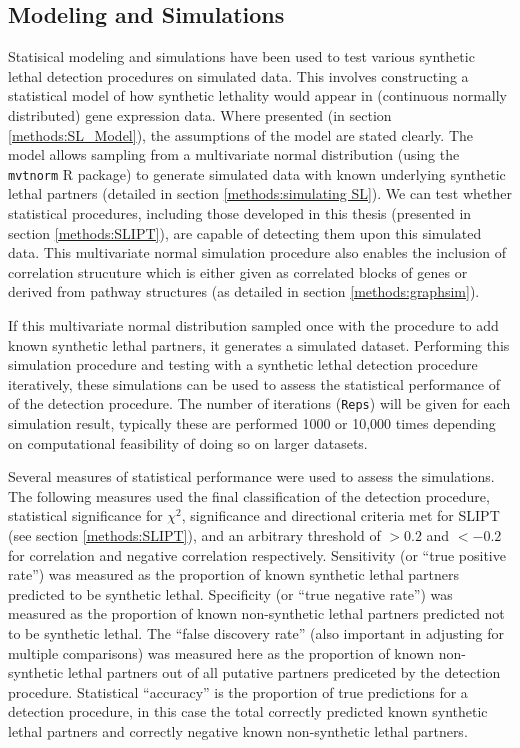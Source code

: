 \subsection{Modeling and Simulations}
Statisical modeling and simulations have been used to test various synthetic lethal detection procedures on simulated data. This involves constructing a statistical model of how synthetic lethality would appear in (continuous normally distributed) gene expression data. Where presented (in section \ref{methods:SL_Model}), the assumptions of the model are stated clearly. The model allows sampling from a multivariate normal distribution (using the \texttt{mvtnorm} R package) to generate simulated data with known underlying synthetic lethal partners (detailed in section \ref{methods:simulating SL}). We can test whether statistical procedures, including those developed in this thesis (presented in section \ref{methods:SLIPT}), are capable of detecting them upon this simulated data. This multivariate normal simulation procedure also enables the inclusion of correlation strucuture which is either given as correlated blocks of genes or derived from pathway structures (as detailed in section \ref{methods:graphsim}).

If this multivariate normal distribution sampled once with the procedure to add known synthetic lethal partners, it generates a simulated dataset. Performing this simulation procedure and testing with a synthetic lethal detection procedure iteratively, these simulations can be used to assess the statistical performance of of the detection procedure. The number of iterations (\texttt{Reps}) will be given for each simulation result, typically these are performed 1000 or 10,000 times depending on computational feasibility of doing so on larger datasets. 

Several measures of statistical performance were used to assess the simulations. The following measures used the final classification of the detection procedure, statistical significance for $\chi^2$, significance and directional criteria met for SLIPT (see section \ref{methods:SLIPT}), and an arbitrary threshold of $>0.2$ and $<-0.2$ for correlation and negative correlation respectively. Sensitivity (or ``true positive rate'') was measured as the proportion of known synthetic lethal partners predicted to be synthetic lethal. Specificity (or ``true negative rate'') was measured as the proportion of known non-synthetic lethal partners predicted not to be synthetic lethal. The ``false discovery rate'' (also important in adjusting for multiple comparisons) was measured here as the proportion of known non-synthetic lethal partners out of all putative partners prediceted by the detection procedure. Statistical ``accuracy'' is the proportion of true predictions for a detection procedure, in this case the total correctly predicted known synthetic lethal partners and correctly negative known non-synthetic lethal partners.

